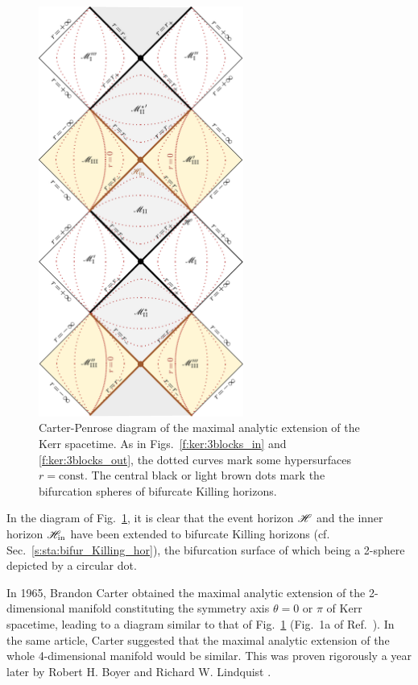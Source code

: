 \begin{figure}
\centerline{\includegraphics[width=0.6\textwidth]{ker_max_ext.pdf}}
\caption[]{\label{f:ker:max_ext} \footnotesize
Carter-Penrose diagram of the maximal
analytic extension of the Kerr spacetime. As in Figs.~\ref{f:ker:3blocks_in}
and \ref{f:ker:3blocks_out},
the dotted curves mark some hypersurfaces $r=\mathrm{const}$.
The central black or light brown dots mark the bifurcation spheres of bifurcate Killing horizons.}
\end{figure}

In the diagram of Fig.~\ref{f:ker:max_ext}, it is clear that the event horizon
$\mathscr{H}$ and the inner horizon $\mathscr{H}_{\rm in}$ have been extended to
bifurcate Killing horizons (cf. Sec.~\ref{s:sta:bifur_Killing_hor}), the bifurcation surface of which being a 2-sphere depicted by a circular dot.

\begin{hist}
In 1965, Brandon Carter \cite{Carte66} obtained the maximal analytic extension
of the 2-dimensional manifold constituting the symmetry axis $\theta=0$ or $\pi$ of Kerr spacetime, leading to a diagram similar to that of Fig.~\ref{f:ker:max_ext} (Fig.~1a of Ref.~\cite{Carte66}). In the same article, Carter suggested that the maximal analytic extension of the whole 4-dimensional
manifold would be similar. This was proven rigorously a year later by
Robert H. Boyer and Richard W. Lindquist \cite{BoyerL67}.
\end{hist}

